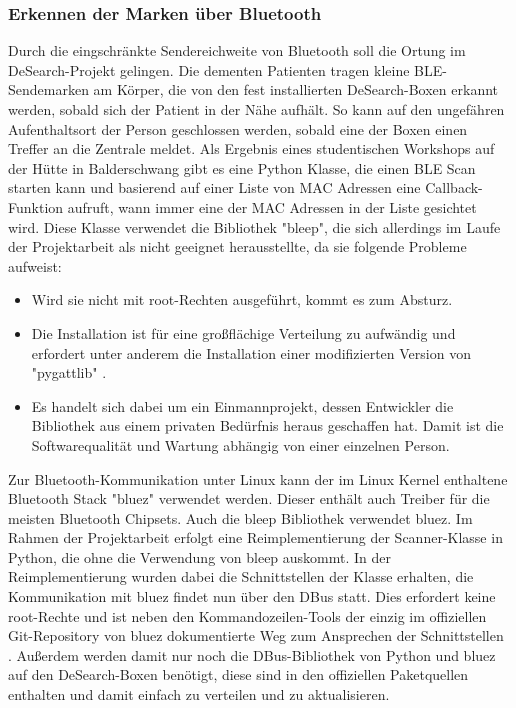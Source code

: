 \subsubsection{Erkennen der Marken über Bluetooth}\label{sssec:bluez}
Durch die eingschränkte Sendereichweite von Bluetooth soll die Ortung im DeSearch-Projekt gelingen. Die dementen Patienten tragen kleine BLE-Sendemarken am Körper, die von den fest installierten DeSearch-Boxen erkannt werden, sobald sich der Patient in der Nähe aufhält. So kann auf den ungefähren Aufenthaltsort der Person geschlossen werden, sobald eine der Boxen einen Treffer an die Zentrale meldet. \newline
Als Ergebnis eines studentischen Workshops auf der Hütte in Balderschwang gibt es eine Python Klasse, die einen BLE Scan starten kann und basierend auf einer Liste von MAC Adressen eine Callback-Funktion aufruft, wann immer eine der MAC Adressen in der Liste gesichtet wird.
Diese Klasse verwendet die Bibliothek "bleep", die sich allerdings im Laufe der Projektarbeit als nicht geeignet herausstellte, da sie folgende Probleme aufweist:
\begin{itemize}
	\item Wird sie nicht mit root-Rechten ausgeführt, kommt es zum Absturz.
	\item Die Installation ist für eine großflächige Verteilung zu aufwändig und erfordert unter anderem die Installation einer modifizierten Version von "pygattlib" \citep[Vgl.][]{bleep-installation}.
	\item Es handelt sich dabei um ein Einmannprojekt, dessen Entwickler die Bibliothek aus einem privaten Bedürfnis heraus geschaffen hat. Damit ist die Softwarequalität und Wartung abhängig von einer einzelnen Person.
\end{itemize}
Zur Bluetooth-Kommunikation unter Linux kann der im Linux Kernel enthaltene Bluetooth Stack "bluez" verwendet werden. Dieser enthält auch Treiber für die meisten Bluetooth Chipsets.
Auch die bleep Bibliothek verwendet bluez. Im Rahmen der Projektarbeit erfolgt eine Reimplementierung der Scanner-Klasse in Python, die ohne die Verwendung von bleep auskommt.
In der Reimplementierung wurden dabei die Schnittstellen der Klasse erhalten, die Kommunikation mit bluez findet nun über den DBus statt. Dies erfordert keine root-Rechte und ist neben den Kommandozeilen-Tools der einzig im offiziellen Git-Repository von bluez dokumentierte Weg zum Ansprechen der Schnittstellen \citep[Vgl.][]{bluez-git}. Außerdem werden damit nur noch die DBus-Bibliothek von Python und bluez auf den DeSearch-Boxen benötigt, diese sind in den offiziellen Paketquellen enthalten und damit einfach zu verteilen und zu aktualisieren.

